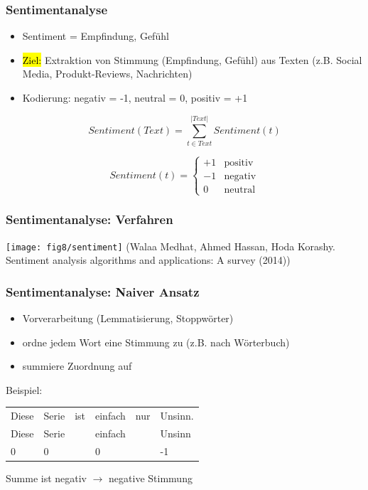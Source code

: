 
\begin{frame}
\frametitle{Sentimentanalyse}

\begin{itemize}
	\item Sentiment = Empfindung, Gefühl
	\item \hl{Ziel:} Extraktion von Stimmung (Empfindung, Gefühl) aus Texten (z.B. Social Media, Produkt-Reviews, Nachrichten)
	\item Kodierung: negativ = -1, neutral = 0, positiv = +1

\end{itemize}

$$
\textit{Sentiment}(Text) = \sum_{t \in \textit{Text}}^{|Text|} \textit{Sentiment}(t)
$$

$$
\textit{Sentiment}(t) = \begin{cases}
    +1 & \text{positiv} \\
    -1 & \text{negativ} \\
    0 & \text{neutral}
\end{cases}
$$
\end{frame}


\begin{frame}
    \frametitle{Sentimentanalyse: Verfahren}

    \texttt{[image: fig8/sentiment]}
    \tiny{(Walaa Medhat, Ahmed Hassan, Hoda Korashy. Sentiment analysis algorithms and applications: A survey (2014))}
\end{frame}


\begin{frame}
\frametitle{Sentimentanalyse: Naiver Ansatz}

\begin{itemize}
	\item Vorverarbeitung (Lemmatisierung, Stoppwörter)
	\item ordne jedem Wort eine Stimmung zu (z.B. nach Wörterbuch)
	\item summiere Zuordnung auf
\end{itemize}

\vspace{\baselineskip}

Beispiel:

\begin{tabular}{llllll}
Diese & Serie & ist & einfach & nur & Unsinn. \\
Diese & Serie &     & einfach &     & Unsinn  \\
0     & 0     &     & 0       &     & -1
\end{tabular}

\vspace{\baselineskip}

Summe ist negativ $\rightarrow$ negative Stimmung
\end{frame}

